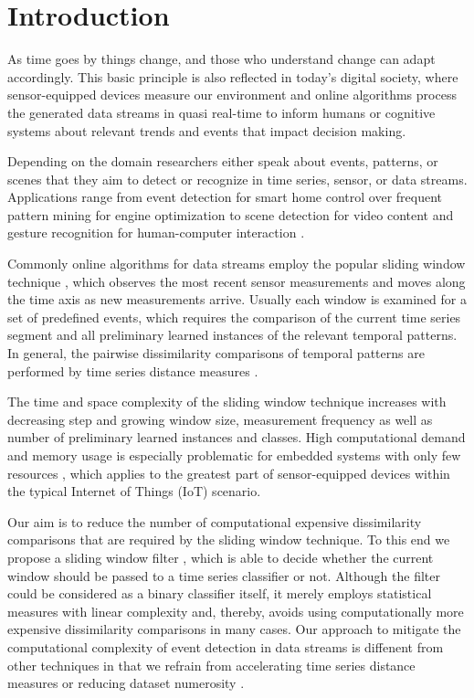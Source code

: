 \section{Introduction} \label{introduction}

As time goes by things change, and those who understand change can adapt accordingly. This basic principle is also reflected in today's digital society, where sensor-equipped devices measure our environment and online algorithms process the generated data streams in quasi real-time to inform humans or cognitive systems about relevant trends and events that impact decision making.

Depending on the domain researchers either speak about events, patterns, or scenes that they aim to detect or recognize in time series, sensor, or data streams. Applications range from event detection for smart home control \cite{spiegel2015metering} over frequent pattern mining for engine optimization \cite{spiegel2015driving} to scene detection for video content \cite{acar2011mediaeval} and gesture recognition for human-computer interaction \cite{liu2009uwave}.

Commonly online algorithms for data streams employ the popular sliding window technique \cite{keogh2004sliding}, which observes the most recent sensor measurements and moves along the time axis as new measurements arrive. Usually each window is examined for a set of predefined events, which requires the comparison of the current time series segment and all preliminary learned instances of the relevant temporal patterns. In general, the pairwise dissimilarity comparisons of temporal patterns are performed by time series distance measures \cite{spiegel2015diss}.

The time and space complexity of the sliding window technique increases with decreasing step and growing window size, measurement frequency as well as number of preliminary learned instances and classes. High computational demand and memory usage is especially problematic for embedded systems with only few resources \cite{kratz2011mobile,wilhelm2015ring}, which applies to the greatest part of sensor-equipped devices within the typical Internet of Things (IoT) scenario. 

Our aim is to reduce the number of computational expensive dissimilarity comparisons that are required by the sliding window technique. To this end we propose a sliding window filter \cite{lesti2017filter}, which is able to decide whether the current window should be passed to a time series classifier or not. Although the filter could be considered as a binary classifier itself, it merely employs statistical measures with linear complexity and, thereby, avoids using computationally more expensive dissimilarity comparisons in many cases. Our approach to mitigate the computational complexity of event detection in data streams is diffenent from other techniques in that we refrain from accelerating time series distance measures \cite{sart2010accelerating,spiegel2014lucky} or reducing dataset numerosity \cite{xi2006fast}.

